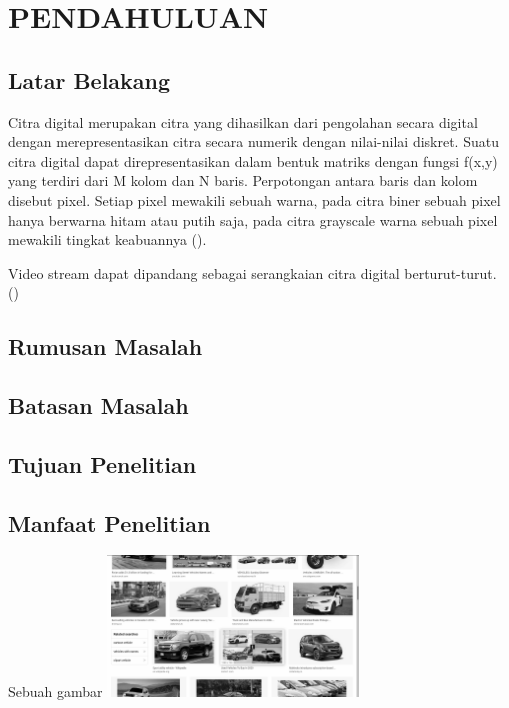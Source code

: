 
\chapter{PENDAHULUAN}

\section{Latar Belakang}
Citra digital merupakan citra yang dihasilkan dari pengolahan secara digital dengan merepresentasikan citra secara numerik dengan nilai-nilai diskret. Suatu citra digital dapat direpresentasikan dalam bentuk matriks dengan fungsi f(x,y) yang terdiri dari M kolom dan N baris. Perpotongan antara baris dan kolom disebut pixel. Setiap pixel mewakili sebuah warna, pada citra biner sebuah pixel hanya berwarna hitam atau putih saja, pada citra grayscale warna sebuah pixel mewakili tingkat keabuannya (\cite{book:darma}).

Video stream dapat dipandang sebagai serangkaian citra digital berturut-turut. (\cite{thesis:jin})
% 

\section{Rumusan Masalah}
\blindtext

\section{Batasan Masalah}
\blindtext

\section{Tujuan Penelitian}
\blindtext

\section{Manfaat Penelitian}
\blindtext




\begin{afigure}{Sebuah gambar}
    \label{fig:figure2}
    \includegraphics[width=0.5\textwidth, center]{images/input.png}
\end{afigure}

